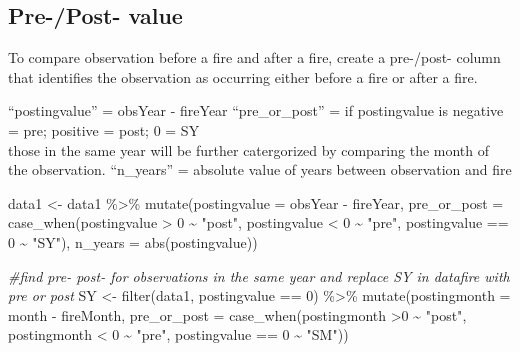 \documentclass[
]{article}
\newenvironment{Shaded}{\begin{snugshade}}{\end{snugshade}}
\newcommand{\AttributeTok}[1]{\textcolor[rgb]{0.77,0.63,0.00}{#1}}
\newcommand{\CommentTok}[1]{\textcolor[rgb]{0.56,0.35,0.01}{\textit{#1}}}
\newcommand{\DecValTok}[1]{\textcolor[rgb]{0.00,0.00,0.81}{#1}}
\newcommand{\FunctionTok}[1]{\textcolor[rgb]{0.00,0.00,0.00}{#1}}
\newcommand{\NormalTok}[1]{#1}
\newcommand{\OtherTok}[1]{\textcolor[rgb]{0.56,0.35,0.01}{#1}}
\newcommand{\SpecialCharTok}[1]{\textcolor[rgb]{0.00,0.00,0.00}{#1}}
\newcommand{\StringTok}[1]{\textcolor[rgb]{0.31,0.60,0.02}{#1}}
\begin{document}
\hypertarget{pre-post--value}{%
\subsection{Pre-/Post- value}\label{pre-post--value}}

To compare observation before a fire and after a fire, create a
pre-/post- column that identifies the observation as occurring either
before a fire or after a fire.

``postingvalue'' = obsYear - fireYear ``pre\_or\_post'' = if
postingvalue is negative = pre; positive = post; 0 = SY\\
those in the same year will be further catergorized by comparing the
month of the observation. ``n\_years'' = absolute value of years between
observation and fire

\begin{Shaded}
\begin{Highlighting}[]
\NormalTok{data1 }\OtherTok{\textless{}{-}}\NormalTok{ data1 }\SpecialCharTok{\%\textgreater{}\%} 
  \FunctionTok{mutate}\NormalTok{(}\AttributeTok{postingvalue =}\NormalTok{ obsYear }\SpecialCharTok{{-}}\NormalTok{ fireYear, }
         \AttributeTok{pre\_or\_post =} \FunctionTok{case\_when}\NormalTok{(postingvalue }\SpecialCharTok{\textgreater{}} \DecValTok{0} \SpecialCharTok{\textasciitilde{}} \StringTok{"post"}\NormalTok{,}
\NormalTok{                                 postingvalue }\SpecialCharTok{\textless{}} \DecValTok{0} \SpecialCharTok{\textasciitilde{}} \StringTok{"pre"}\NormalTok{,}
\NormalTok{                                 postingvalue }\SpecialCharTok{==} \DecValTok{0} \SpecialCharTok{\textasciitilde{}} \StringTok{"SY"}\NormalTok{),}
         \AttributeTok{n\_years =} \FunctionTok{abs}\NormalTok{(postingvalue))}
  
\CommentTok{\#find pre{-} post{-} for observations in the same year and replace SY in datafire with pre or post}
\NormalTok{SY }\OtherTok{\textless{}{-}} \FunctionTok{filter}\NormalTok{(data1, postingvalue }\SpecialCharTok{==} \DecValTok{0}\NormalTok{) }\SpecialCharTok{\%\textgreater{}\%} 
  \FunctionTok{mutate}\NormalTok{(}\AttributeTok{postingmonth =}\NormalTok{ month }\SpecialCharTok{{-}}\NormalTok{ fireMonth,}
    \AttributeTok{pre\_or\_post =} \FunctionTok{case\_when}\NormalTok{(postingmonth }\SpecialCharTok{\textgreater{}}\DecValTok{0} \SpecialCharTok{\textasciitilde{}} \StringTok{"post"}\NormalTok{,}
\NormalTok{                            postingmonth }\SpecialCharTok{\textless{}} \DecValTok{0} \SpecialCharTok{\textasciitilde{}} \StringTok{"pre"}\NormalTok{,}
\NormalTok{                            postingvalue }\SpecialCharTok{==} \DecValTok{0} \SpecialCharTok{\textasciitilde{}} \StringTok{"SM"}\NormalTok{))}


\end{Highlighting}
\end{Shaded}
\end{document}
